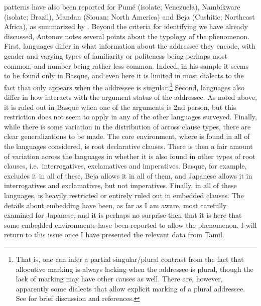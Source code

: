 \documentclass[output=paper, modfonts, nonflat]{langsci/langscibook}
\begin{document}
\allagr{} patterns have also been reported for Pum\'e (isolate;\largerpage
Venezuela), Nambikware (isolate; Brazil), Mandan (Siouan; North
America) and Beja (Cushitic; Northeast Africa), as summarized by
\citet{antonov:2015}. Beyond the criteria for identifying \allagr{} we
have already discussed, Antonov notes several points about the
typology of the phenomenon. First, languages differ in what
information about the addressee they encode, with gender and varying
types of familiarity or politeness being perhaps most common, and
number being rather less common. Indeed, in his sample it seems to be
found only in Basque, and even here it is limited in most dialects to
the fact that \allagr{} only appears when the addressee is
singular.\footnote{That is, one can infer a partial singular/plural
  contrast from the fact that allocutive marking is always lacking
  when the addressee is plural, though the lack of marking may have
  other causes as well. There are, however, apparently some dialects
  that allow explicit marking of a plural addressee. See
  \citet{antonov:2015} for brief discussion and references.} Second,
languages also differ in how \allagr{} interacts with the argument
status of the addressee. As noted above, it is ruled out in Basque
when one of the arguments is 2nd person, but this restriction does not
seem to apply in any of the other languages surveyed. Finally, while
there is some variation in the distribution of \allagr{} across clause
types, there are clear generalizations to be made. The core
environment, where \allagr{} is found in all of the languages
considered, is root declarative clauses. There is then a fair amount
of variation across the languages in whether it is also found in other
types of root clauses, i.e.\ interrogatives, exclamatives and
imperatives. Basque, for example, excludes it in all of these, Beja
allows it in all of them, and Japanese allows it in interrogatives and
exclamatives, but not imperatives. Finally, in all of these languages,
\allagr{} is heavily restricted or entirely ruled out in embedded
clauses. The details about embedding have been, as far as I am aware,
most carefully examined for Japanese, and it is perhaps no surprise
then that it is here that some embedded environments have been
reported to allow the phenomenon. I will return to this issue once I
have presented the relevant data from Tamil.
\end{document}
